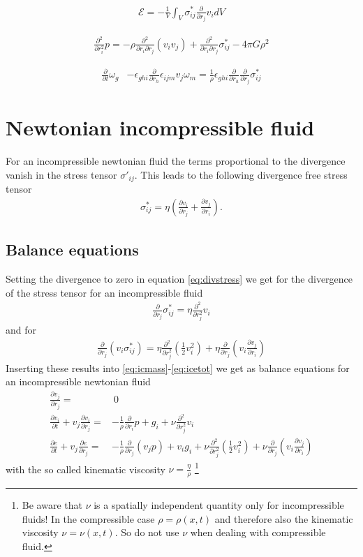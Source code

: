 \documentclass[a4paper,
					12pt,
					twoside,
					pagesize,
					cleardoubleplain,
					headsepline,
					bibtotoc
					]{scrbook}
\newcommand{\lra}[1]{{ \left( #1 \right) }}
\newcommand{\pd}[1]{\frac{\partial}{\partial #1}}
\newcommand{\ppd}[2]{\frac{\partial #2}{\partial #1}}
\newcommand{\pdd}[1]{\frac{\partial^2}{\partial #1^2}}
\begin{document}
\begin{align}
\mathcal{E} = 
-\frac{1}{V} \int_V \sigma^*_{ij}\pd{r_j} v_i dV
\label{eq:icdiss}
\end{align}

\begin{align}
\pdd{r_i}p= 
-\rho \frac{\partial^2}{\partial r_i \partial r_j}(v_i v_j)
+\frac{\partial^2}{\partial r_i \partial r_j}\sigma^*_{ij} 
-4\pi G \rho^2
\label{eq:icdiv}
\end{align}

\begin{align}
\pd{t}\omega_g
&-\epsilon_{ghi}\pd{r_h} \epsilon_{ijm} v_j \omega_m =
\frac{1}{\rho}\epsilon_{ghi}\pd{r_h}\pd{r_j}\sigma^*_{ij}
\label{eq:icvort}
\end{align}


\chapter{Newtonian incompressible fluid}
For an incompressible newtonian fluid the terms proportional to the divergence
vanish in the stress tensor $\sigma'_{ij}$. This leads to the following
divergence free stress tensor
\begin{align}
\sigma^*_{ij}=\eta \lra{\ppd{r_j}{v_i}+\ppd{r_i}{v_j}}. 
\label{eq:nicstress}
\end{align}

\section{Balance equations}
Setting the divergence to zero in equation \ref{eq:divstress} we get for
the divergence of the stress tensor for an incompressible fluid
\begin{align}
\pd{r_j} \sigma^*_{ij} =\eta \pdd{r_j}v_i \label{eq:nicdivstress}
\end{align}
and for
\begin{align}
\pd{r_j}(v_i \sigma^*_{ij})
=\eta \pdd{r_j}\lra{\frac{1}{2}v_i^2}+\eta\pd{r_j}\lra{v_i\ppd{r_i}{v_j}}
\end{align}
Inserting these results into \eqref{eq:icmass}-\eqref{eq:icetot} we get
as balance equations for an incompressible newtonian fluid
\begin{align}
\ppd{r_j}{v_j} =&\ 0\\
\ppd{t}{v_i} + v_j \ppd{r_j}{v_i} =& -\frac{1}{\rho}\pd{r_i}p + g_i
+\nu\pdd{r_j}v_i\\
\ppd{t}{e} + v_j \ppd{r_j}{e} =& -\frac{1}{\rho} \pd{r_j}(v_j p) + v_i g_i
+\nu \pdd{r_j}\lra{\frac{1}{2}v_i^2}+ \nu \pd{r_j}\lra{v_i\ppd{r_i}{v_j}}
\end{align}
with the so called kinematic viscosity $\nu=\frac{\eta}{\rho}$
\footnote{Be aware that $\nu$ is a spatially independent quantity only 
for incompressible fluids! In the compressible case $\rho=\rho(x,t)$ and
therefore also the kinematic viscosity $\nu=\nu(x,t)$. So do not use $\nu$
when dealing with compressible fluid.}
\end{document}
